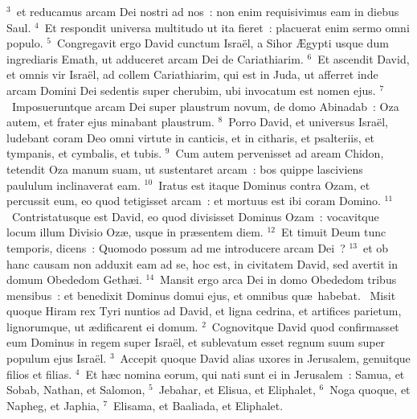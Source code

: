 ${}^{3}$~et reducamus arcam Dei nostri ad nos~: non enim requisivimus eam in diebus Saul.
${}^{4}$~Et respondit universa multitudo ut ita fieret~: placuerat enim sermo omni populo.
${}^{5}$~Congregavit ergo David cunctum Isra\"el, a Sihor \AE gypti usque dum ingrediaris Emath, ut adduceret arcam Dei de Cariathiarim.
${}^{6}$~Et ascendit David, et omnis vir Isra\"el, ad collem Cariathiarim, qui est in Juda, ut afferret inde arcam Domini Dei sedentis super cherubim, ubi invocatum est nomen ejus.
${}^{7}$~Imposueruntque arcam Dei super plaustrum novum, de domo Abinadab~: Oza autem, et frater ejus minabant plaustrum.
${}^{8}$~Porro David, et universus Isra\"el, ludebant coram Deo omni virtute in canticis, et in citharis, et psalteriis, et tympanis, et cymbalis, et tubis.
${}^{9}$~Cum autem pervenisset ad aream Chidon, tetendit Oza manum suam, ut sustentaret arcam~: bos quippe lasciviens paululum inclinaverat eam.
${}^{10}$~Iratus est itaque Dominus contra Ozam, et percussit eum, eo quod tetigisset arcam~: et mortuus est ibi coram Domino.
${}^{11}$~Contristatusque est David, eo quod divisisset Dominus Ozam~: vocavitque locum illum Divisio Oz\ae , usque in pr\ae sentem diem.
${}^{12}$~Et timuit Deum tunc temporis, dicens~: Quomodo possum ad me introducere arcam Dei~?
${}^{13}$~et ob hanc causam non adduxit eam ad se, hoc est, in civitatem David, sed avertit in domum Obededom Geth\ae i.
${}^{14}$~Mansit ergo arca Dei in domo Obededom tribus mensibus~: et benedixit Dominus domui ejus, et omnibus qu\ae\ habebat.
~Misit quoque Hiram rex Tyri nuntios ad David, et ligna cedrina, et artifices parietum, lignorumque, ut \ae dificarent ei domum.
${}^{2}$~Cognovitque David quod confirmasset eum Dominus in regem super Isra\"el, et sublevatum esset regnum suum super populum ejus Isra\"el.
${}^{3}$~Accepit quoque David alias uxores in Jerusalem, genuitque filios et filias.
${}^{4}$~Et h\ae c nomina eorum, qui nati sunt ei in Jerusalem~: Samua, et Sobab, Nathan, et Salomon,
${}^{5}$~Jebahar, et Elisua, et Eliphalet,
${}^{6}$~Noga quoque, et Napheg, et Japhia,
${}^{7}$~Elisama, et Baaliada, et Eliphalet.


